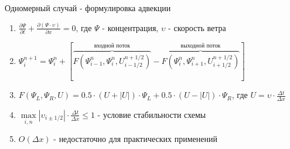 \begin{frame}{Одномерный случай - формулировка адвекции\cite{smolar:mpdata-1d}}

\begin{enumerate}
  \item $ \frac{\partial \Psi}{\partial t} + \frac{\partial (\Psi \cdot \upsilon)}{\partial x} = 0 $, где $\Psi$ - концентрация, $\upsilon$ - скорость ветра
  \item $ \Psi^{n+1}_i = \Psi^{n}_i + [\overbrace{F(\Psi^{n}_{i-1}, \Psi^{n}_{i}, U^{n+1/2}_{i-1/2})}^\text{входной поток} - \overbrace{F(\Psi^{n}_{i}, \Psi^{n}_{i+1}, U^{n+1/2}_{i+1/2})}^\text{выходной поток}] $
  \item $F(\Psi_L, \Psi_R, U)=0.5\cdot(U+|U|)\cdot \Psi_L + 0.5\cdot(U-|U|)\cdot \Psi_R$, где $U=\upsilon \cdot \frac{\Delta t}{\Delta x}$
  \item $\underset{i, n}{\max}|\upsilon_{i\pm1/2}|\cdot \frac{\Delta t}{\Delta x}\leqslant1$ - условие стабильности схемы
  \item $O(\Delta x)$ - недостаточно для практических применений
\end{enumerate}

\end{frame}



